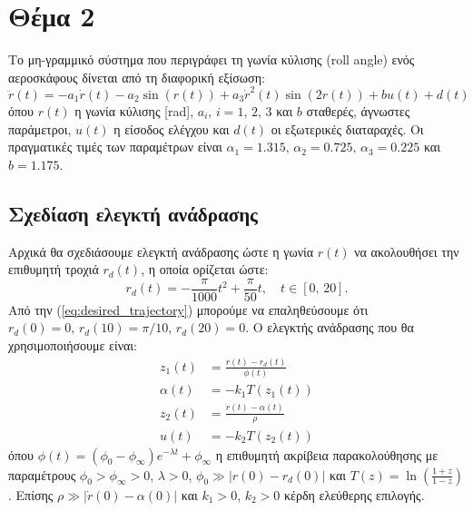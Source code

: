 \documentclass[a4paper,12pt]{article}
\begin{document}
\section*{Θέμα 2}

Το μη-γραμμικό σύστημα που περιγράφει τη γωνία κύλισης 
(roll angle) ενός αεροσκάφους δίνεται από τη διαφορική εξίσωση:
\begin{equation}
    \ddot{r}(t) = -a_1 \dot{r}(t) - a_2 \sin(r(t)) + a_3 \dot{r}^2(t) \sin(2r(t)) + b u(t) + d(t)
    \label{eq:roll_angle_system}
\end{equation}
όπου $r(t)$ η γωνία κύλισης [rad],
$a_i, \, i = 1,\,2,\,3$ και $b$ σταθερές, άγνωστες παράμετροι, $u(t)$ η είσοδος ελέγχου και $d(t)$
οι εξωτερικές διαταραχές. Οι πραγματικές τιμές των παραμέτρων είναι $\alpha_1 = 1.315, \, \alpha_2 = 0.725, \, \alpha_3 = 0.225$ και $b = 1.175$.

\subsection*{Σχεδίαση ελεγκτή ανάδρασης}

Αρχικά θα σχεδιάσουμε ελεγκτή ανάδρασης ώστε η γωνία $r(t)$ να ακολουθήσει την επιθυμητή τροχιά $r_d(t)$, η
οποία ορίζεται ώστε:
\begin{equation}
    r_d(t) = -\frac{\pi}{1000}t^2 + \frac{\pi}{50}t, \quad t \in [0,\,20].
    \label{eq:desired_trajectory}
\end{equation}
Από την (\ref{eq:desired_trajectory}) μπορούμε να επαληθεύσουμε ότι 
$r_d(0) = 0, \, r_d(10) = \pi / 10, \, r_d(20) = 0$.
Ο ελεγκτής ανάδρασης που θα χρησιμοποιήσουμε είναι:
\begin{equation}
    \begin{aligned}
    z_1(t) &= \frac{r(t) - r_d(t)}{\phi(t)} \\
    \alpha(t) &= -k_1 T(z_1(t)) \\
    z_2(t) &= \frac{\dot{r}(t) - \alpha(t)}{\rho} \\
    u(t) &= -k_2 T(z_2(t))
    \end{aligned}
    \label{eq:feedback_controller}
\end{equation}
όπου $\phi(t) = (\phi_0 - \phi_\infty) e^{-\lambda t} + \phi_\infty$ η επιθυμητή ακρίβεια παρακολούθησης
με παραμέτρους $\phi_0 > \phi_{\infty} > 0$, $\lambda > 0$, $\phi_0 \gg |r(0) - r_d(0)|$ και
$T(z) = \ln\left( \frac{1+z}{1-z} \right)$. Επίσης $\rho \gg |\dot{r}(0) - \alpha(0)|$ και $k_1 > 0$, $k_2 > 0$
κέρδη ελεύθερης επιλογής.
\end{document}
